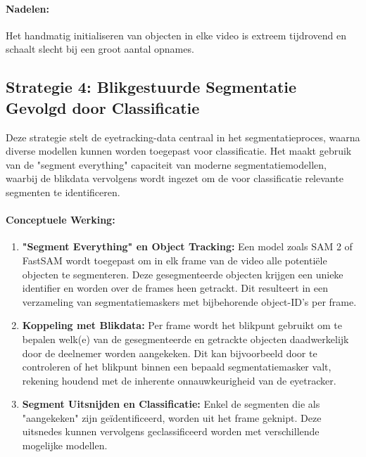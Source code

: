\paragraph{Nadelen:}
Het handmatig initialiseren van objecten in elke video is extreem tijdrovend en schaalt slecht bij een groot aantal opnames.

\subsection{Strategie 4: Blikgestuurde Segmentatie Gevolgd door Classificatie}

Deze strategie stelt de eyetracking-data centraal in het segmentatieproces, waarna diverse modellen kunnen worden toegepast voor classificatie.
Het maakt gebruik van de "segment everything" capaciteit van moderne segmentatiemodellen, waarbij de blikdata vervolgens wordt ingezet om de voor classificatie relevante segmenten te identificeren.

\paragraph{Conceptuele Werking:}
\begin{enumerate}
    \item \textbf{"Segment Everything" en Object Tracking:} Een model zoals SAM 2 of FastSAM wordt toegepast om in elk frame van de video alle potentiële objecten te segmenteren. 
    Deze gesegmenteerde objecten krijgen een unieke identifier en worden over de frames heen getrackt. Dit resulteert in een verzameling van segmentatiemaskers met bijbehorende object-ID's per frame.
    \item \textbf{Koppeling met Blikdata:} Per frame wordt het blikpunt gebruikt om te bepalen welk(e) van de gesegmenteerde en getrackte objecten daadwerkelijk door de deelnemer worden aangekeken. 
    Dit kan bijvoorbeeld door te controleren of het blikpunt binnen een bepaald segmentatiemasker valt, rekening houdend met de inherente onnauwkeurigheid van de eyetracker.
    \item \textbf{Segment Uitsnijden en Classificatie:} Enkel de segmenten die als "aangekeken" zijn geïdentificeerd, worden uit het frame geknipt.
    Deze uitsnedes kunnen vervolgens geclassificeerd worden met verschillende mogelijke modellen.
\end{enumerate}

